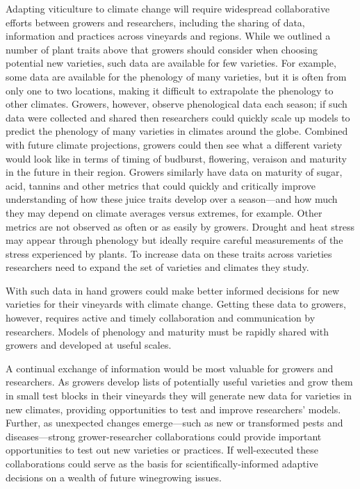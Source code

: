 \documentclass[11pt,letterpaper]{article}
\begin{document}
Adapting viticulture to climate change will require widespread collaborative efforts between growers and researchers, including the sharing of data, information and practices across vineyards and regions. While we outlined a number of plant traits above that growers should consider when choosing potential new varieties, such data are available for few varieties. For example, some data are available for the phenology of many varieties, but it is often from only one to two locations, making it difficult to extrapolate the phenology to other climates. Growers, however, observe phenological data each season; if such data were collected and shared then researchers could quickly scale up models to predict the phenology of many varieties in climates around the globe. Combined with future climate projections, growers could then see what a different variety would look like in terms of timing of budburst, flowering, veraison and maturity in the future in their region. Growers similarly have data on maturity of sugar, acid, tannins and other metrics that could quickly and critically improve understanding of how these juice traits develop over a season---and how much they may depend on climate averages versus extremes, for example. Other metrics are not observed as often or as easily by growers. Drought and heat stress may appear through phenology but ideally require careful measurements of the stress experienced by plants. To increase data on these traits across varieties researchers need to expand the set of varieties and climates they study. 

With such data in hand growers could make better informed decisions for new varieties for their vineyards with climate change. Getting these data to growers, however, requires active and timely collaboration and communication by researchers. Models of phenology and maturity must be rapidly shared with growers and developed at useful scales. 

A continual exchange of information would be most valuable for growers and researchers. As growers develop lists of potentially useful varieties and grow them in small test blocks in their vineyards they will generate new data for varieties in new climates, providing opportunities to test and improve researchers' models. Further, as unexpected changes emerge---such as new or transformed pests and diseases---strong grower-researcher collaborations could provide important opportunities to test out new varieties or practices. If well-executed these collaborations could serve as the basis for scientifically-informed adaptive decisions on a wealth of future winegrowing issues.
\end{document}
